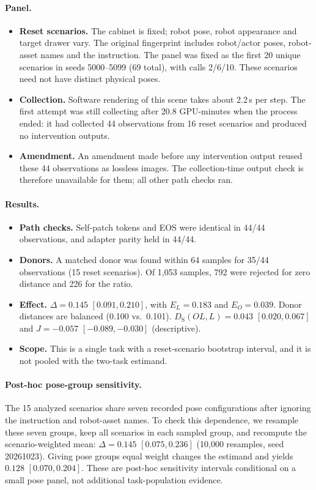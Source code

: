 \paragraph{Panel.}
\begin{itemize}
\item \textbf{Reset scenarios.} The cabinet is fixed; robot pose, robot appearance and target drawer vary. The original fingerprint includes robot/actor poses, robot-asset names and the instruction. The panel was fixed as the first 20 unique scenarios in seeds 5000--5099 (69 total), with calls 2/6/10. These scenarios need not have distinct physical poses.
\item \textbf{Collection.} Software rendering of this scene takes about 2.2\,s per step. The first attempt was still collecting after 20.8 GPU-minutes when the process ended: it had collected 44 observations from 16 reset scenarios and produced no intervention outputs.
\item \textbf{Amendment.} An amendment made before any intervention output reused these 44 observations as lossless images. The collection-time output check is therefore unavailable for them; all other path checks ran.
\end{itemize}

\paragraph{Results.}
\begin{itemize}
\item \textbf{Path checks.} Self-patch tokens and EOS were identical in 44/44 observations, and adapter parity held in 44/44.
\item \textbf{Donors.} A matched donor was found within 64 samples for 35/44 observations (15 reset scenarios). Of 1,053 samples, 792 were rejected for zero distance and 226 for the ratio.
\item \textbf{Effect.} $\Delta=0.145$ $[0.091,0.210]$, with $E_L=0.183$ and $E_O=0.039$. Donor distances are balanced (0.100 vs.\ 0.101). $D_{\mathrm S}(OL,L)=0.043$ $[0.020,0.067]$ and $J=-0.057$ $[-0.089,-0.030]$ (descriptive).
\item \textbf{Scope.} This is a single task with a reset-scenario bootstrap interval, and it is not pooled with the two-task estimand.
\end{itemize}


\paragraph{Post-hoc pose-group sensitivity.}
The 15 analyzed scenarios share seven recorded pose configurations after ignoring the instruction and robot-asset names. To check this dependence, we resample these seven groups, keep all scenarios in each sampled group, and recompute the scenario-weighted mean: $\Delta=0.145$ $[0.075,0.236]$ (10,000 resamples, seed 20261023). Giving pose groups equal weight changes the estimand and yields $0.128$ $[0.070,0.204]$. These are post-hoc sensitivity intervals conditional on a small pose panel, not additional task-population evidence.

